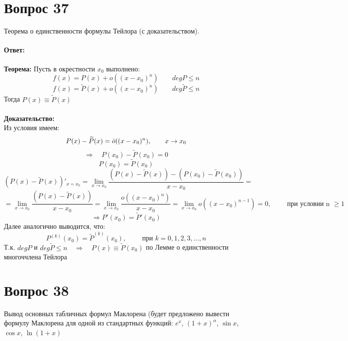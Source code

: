 \documentclass{article}
\begin{document}
 
\part*{Вопрос 37}
\begin{center}
Теорема о единственности формулы Тейлора (с доказательством).
\end{center}
\subsection*{Ответ:}
\textbf{Теорема:}
Пусть в окрестности $x_0$ выполнено:
$$f(x)=P(x)+o((x-x_0)^n)\qquad deg P \leqslant n$$
$$f(x)=\widetilde{P}(x)+o((x-x_0)^n)\qquad deg \widetilde{P} \leqslant n$$
Тогда $P(x)\equiv\widetilde{P}(x)$\\\\
\textbf{Доказательство:}\\
Из условия имеем:
$$P(x)-\widetilde{P}(x)=\Bar{o}((x-x_0)^n),\qquad x\to x_0$$
$$\Rightarrow\quad P(x_0)-\widetilde{P}(x_0)=0$$
$$\boxed{P(x_0)=\widetilde{P}(x_0)}$$
$$(P(x)-\widetilde{P}(x))'_{x=x_0}=\lim_{x\to x_0}\frac{(P(x)-\widetilde{P}(x))-(P(x_0)-\widetilde{P}(x_0))}{x-x_0}=$$
$$=\lim_{x\to x_0}\frac{(P(x)-\widetilde{P}(x))}{x-x_0}=\lim_{x\to x_0}\frac{o((x-x_0)^n)}{x-x_0}=\lim_{x\to x_0}o((x-x_0)^{n-1})=0,\qquad \text{ при условии n } \geqslant 1$$
$$\Rightarrow P'(x_0)=\widetilde{P}'(x_0)$$
Далее аналогично выводится, что:
$$P^{(k)}(x_0)=\widetilde{P}^{(k)}(x_0),\qquad\text{ при } k=0,1,2,3,\ldots,n $$
Т.к. $deg P$ и $deg \widetilde{P} \leqslant n \quad\Rightarrow\quad P(x)\equiv \widetilde{P}(x_0)$ по Лемме о единственности многоччлена Тейлора
 
\part*{Вопрос 38}
\begin{center}
Вывод основных табличных формул Маклорена (будет предложено вывести формулу Маклорена для одной из стандартных функций: $e^x$, $(1+x)^\alpha$, $\sin x$, $\cos x$, $\ln(1+x)$
\end{center}
\end{document}
